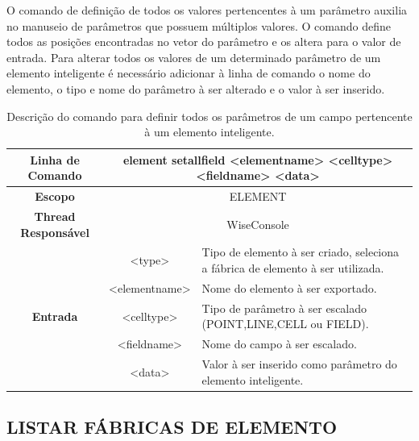 O comando de definição de todos os valores pertencentes à um parâmetro auxilia no manuseio de parâmetros que possuem múltiplos valores. O comando define todos as posições encontradas no vetor do parâmetro e os altera para o valor de entrada. Para alterar todos os valores de um determinado parâmetro de um elemento inteligente é necessário adicionar à linha de comando o nome do elemento, o tipo e nome do parâmetro à ser alterado e o valor à ser inserido.

\begin{center}
	\begin{table}[!htbp]
		\begin{tabularx}{\textwidth}{c|c|X}
			\toprule
			\textbf{Linha de Comando} & \multicolumn{2}{c}{element set\underline{\space\space}all\underline{\space\space}field <element\underline{\space\space}name> <cell\underline{\space\space}type> <field\underline{\space\space}name> <data>} \\
			\midrule
			\textbf{Escopo} & \multicolumn{2}{c}{ELEMENT} \\
			\hline
			\textbf{Thread Responsável} & \multicolumn{2}{c}{WiseConsole} \\
			\hline
			\multirow{5}{*}{\textbf{Entrada}} & <type> & Tipo de elemento à ser criado, seleciona a fábrica de elemento à ser utilizada. \\
			
			& <element\underline{\space\space}name> & Nome do elemento à ser exportado. \\
			& <cell\underline{\space\space}type> & Tipo de parâmetro à ser escalado (POINT,LINE,CELL ou FIELD). \\
			& <field\underline{\space\space}name> & Nome do campo à ser escalado. \\
			& <data> & Valor à ser inserido como parâmetro do elemento inteligente. \\
			\bottomrule
		\end{tabularx}
		\caption{Descrição do comando para definir todos os parâmetros de um campo pertencente à um elemento inteligente.}
		\label{tab:set_all_field_element}
	\end{table}
\end{center}

\subsection{LISTAR FÁBRICAS DE ELEMENTO}\label{sec:list_element_factories}

